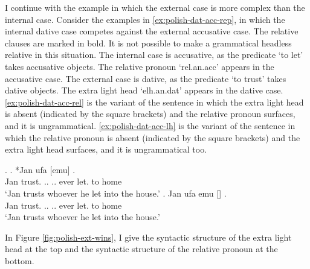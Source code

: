 I continue with the example in which the external case is more complex than the internal case.
Consider the examples in \ref{ex:polish-dat-acc-rep}, in which the internal dative case competes against the external accusative case. The relative clauses are marked in bold. It is not possible to make a grammatical headless relative in this situation.
The internal case is accusative, as the predicate  `to let' takes accusative objects. The relative pronoun  `\ac{rel}.\ac{an}.\ac{acc}' appears in the accusative case.
The external case is dative, as the predicate  `to trust' takes dative objects. The extra light head  `\ac{elh}.\ac{an}.\ac{dat}' appears in the dative case.
\ref{ex:polish-dat-acc-rel} is the variant of the sentence in which the extra light head is absent (indicated by the square brackets) and the relative pronoun surfaces, and it is ungrammatical.
\ref{ex:polish-dat-acc-lh} is the variant of the sentence in which the relative pronoun is absent (indicated by the square brackets) and the extra light head surfaces, and it is ungrammatical too.

\ex.\label{ex:polish-dat-acc-rep}
\ag. *Jan ufa [emu]     .\\
Jan trust.\scsub{[dat]} .. .. ever let.\scsub{[acc]} to home\\
`Jan trusts whoever he let into the house.' \label{ex:polish-dat-acc-rel}
\bg. Jan ufa emu []    .\\
Jan trust.\scsub{[dat]} .. .. ever let.\scsub{[acc]} to home\\
`Jan trusts whoever he let into the house.' \label{ex:polish-dat-acc-lh}

In Figure \ref{fig:polish-ext-wins}, I give the syntactic structure of the extra light head at the top and the syntactic structure of the relative pronoun at the bottom.

